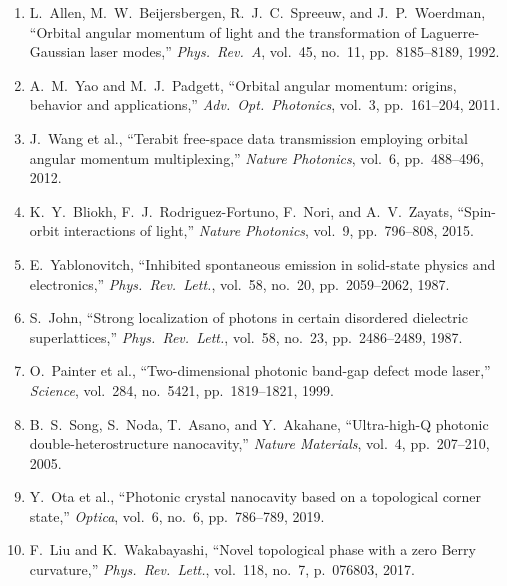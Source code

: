 \documentclass[12pt,a4paper,oneside]{book}
\theoremstyle{plain}
\theoremstyle{definition}
\theoremstyle{remark}
\begin{document}
{\begin{enumerate}
    \item L.~Allen, M.~W.~Beijersbergen, R.~J.~C.~Spreeuw, and J.~P.~Woerdman, ``Orbital angular momentum of light and the transformation of Laguerre-Gaussian laser modes,'' \textit{Phys.\ Rev.\ A}, vol.~45, no.~11, pp.~8185--8189, 1992.
    \item A.~M.~Yao and M.~J.~Padgett, ``Orbital angular momentum: origins, behavior and applications,'' \textit{Adv.\ Opt.\ Photonics}, vol.~3, pp.~161--204, 2011.
    \item J.~Wang et al., ``Terabit free-space data transmission employing orbital angular momentum multiplexing,'' \textit{Nature Photonics}, vol.~6, pp.~488--496, 2012.
    \item K.~Y.~Bliokh, F.~J.~Rodriguez-Fortuno, F.~Nori, and A.~V.~Zayats, ``Spin-orbit interactions of light,'' \textit{Nature Photonics}, vol.~9, pp.~796--808, 2015.
    \item E.~Yablonovitch, ``Inhibited spontaneous emission in solid-state physics and electronics,'' \textit{Phys.\ Rev.\ Lett.}, vol.~58, no.~20, pp.~2059--2062, 1987.
    \item S.~John, ``Strong localization of photons in certain disordered dielectric superlattices,'' \textit{Phys.\ Rev.\ Lett.}, vol.~58, no.~23, pp.~2486--2489, 1987.
    \item O.~Painter et al., ``Two-dimensional photonic band-gap defect mode laser,'' \textit{Science}, vol.~284, no.~5421, pp.~1819--1821, 1999.
    \item B.~S.~Song, S.~Noda, T.~Asano, and Y.~Akahane, ``Ultra-high-Q photonic double-heterostructure nanocavity,'' \textit{Nature Materials}, vol.~4, pp.~207--210, 2005.
    \item Y.~Ota et al., ``Photonic crystal nanocavity based on a topological corner state,'' \textit{Optica}, vol.~6, no.~6, pp.~786--789, 2019.
    \item F.~Liu and K.~Wakabayashi, ``Novel topological phase with a zero Berry curvature,'' \textit{Phys.\ Rev.\ Lett.}, vol.~118, no.~7, p.~076803, 2017.
  \end{enumerate}
}
\end{document}
